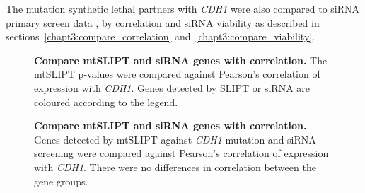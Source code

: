 The mutation synthetic lethal partners with \textit{CDH1} were also compared to \gls{siRNA} primary screen data \citep{Telford2015}, by correlation and \gls{siRNA} viability as described in sections~\ref{chapt3:compare_correlation} and~\ref{chapt3:compare_viability}.

\begin{figure}[!htp]
\begin{center}
   \end{center}
   \caption[Compare \acrshort{mtSLIPT} and \gls{siRNA} genes with correlation]{\small \textbf{Compare \acrshort{mtSLIPT} and \gls{siRNA} genes with correlation.} The \acrshort{mtSLIPT} p-values were compared against Pearson's correlation of expression with \textit{CDH1}. Genes detected by SLIPT or \gls{siRNA} are coloured according to the legend. 
}
\label{fig:compare_points_correlation_mtSL}

\begin{center}
   \end{center}
   \caption[Compare \acrshort{mtSLIPT} and \gls{siRNA} genes with correlation]{\small \textbf{Compare \acrshort{mtSLIPT} and \gls{siRNA} genes with correlation.}  Genes detected by \acrshort{mtSLIPT} against \textit{CDH1} mutation and \gls{siRNA} screening were compared against Pearson's correlation of expression with \textit{CDH1}. There were no differences in correlation between the gene groups. 
}
\label{fig:compare_correlation_mtSL}
\end{figure}

